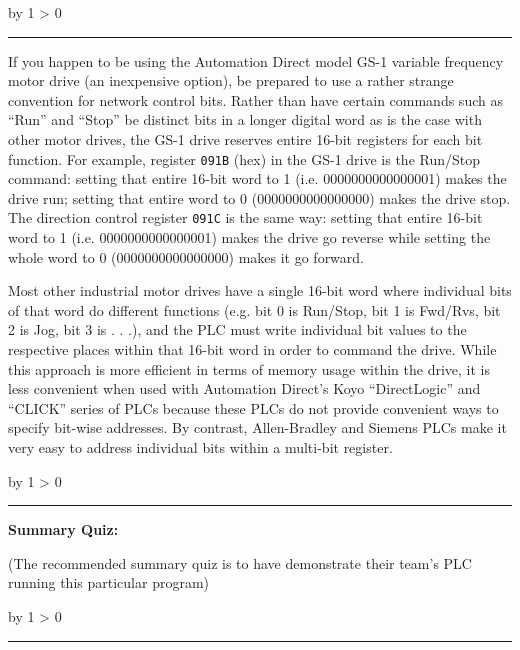\documentclass[12pt,a4paper]{article}
\def\oppgave{
            \advance\questnum by 1
            \ifnum \questnum > 0
                 \hrule
                 \vskip 3pt
                 \leftline{Oppgave \the\questnum}
                 \vskip 3pt \fi}
\def\svar{
           \advance\answnum by 1
           \ifnum \answnum > 0
                \hrule
                \vskip 3pt
                \leftline{Svar \the\answnum}
                \vskip 3pt \fi}
\def\notes{
           \advance\explnum by 1
           \ifnum \explnum > 0
                \hrule
                \vskip 3pt
                \leftline{Notes \the\explnum}
                \vskip 3pt \fi}
\begin{document}
\vfil 

\eject
\vskip 10pt \filbreak 





\svar{} 

If you happen to be using the Automation Direct model GS-1 variable frequency motor drive (an inexpensive option), be prepared to use a rather strange convention for network control bits.  Rather than have certain commands such as ``Run'' and ``Stop'' be distinct bits in a longer digital word as is the case with other motor drives, the GS-1 drive reserves entire 16-bit registers for each bit function.  For example, register {\tt 091B} (hex) in the GS-1 drive is the Run/Stop command: setting that entire 16-bit word to 1 (i.e. 0000000000000001) makes the drive run; setting that entire word to 0 (0000000000000000) makes the drive stop.  The direction control register {\tt 091C} is the same way: setting that entire 16-bit word to 1 (i.e. 0000000000000001) makes the drive go reverse while setting the whole word to 0 (0000000000000000) makes it go forward.

Most other industrial motor drives have a single 16-bit word where individual bits of that word do different functions (e.g. bit 0 is Run/Stop, bit 1 is Fwd/Rvs, bit 2 is Jog, bit 3 is . . .), and the PLC must write individual bit values to the respective places within that 16-bit word in order to command the drive.  While this approach is more efficient in terms of memory usage within the drive, it is less convenient when used with Automation Direct's Koyo ``DirectLogic'' and ``CLICK'' series of PLCs because these PLCs do not provide convenient ways to specify bit-wise addresses.  By contrast, Allen-Bradley and Siemens PLCs make it very easy to address individual bits within a multi-bit register.

\vskip 10pt \filbreak 





\notes{} 

\vfil \eject

\noindent
{\bf Summary Quiz:}

(The recommended summary quiz is to have  demonstrate their team's PLC running this particular program)


\vfil \eject 


\oppgave{} 
\end{document}
